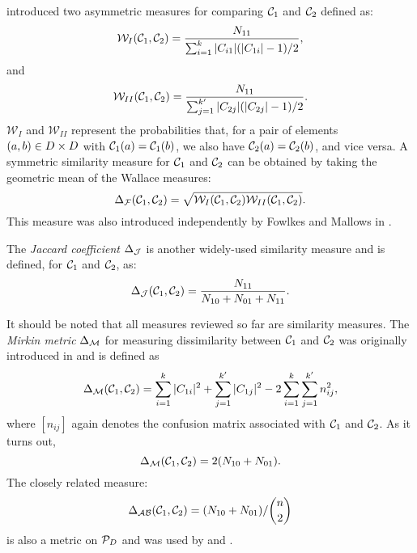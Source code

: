 \citet{wallace-1983} introduced two asymmetric measures for comparing
$\mathcal{C}_1$ and $\mathcal{C}_2$ defined as:
\begin{equation*}
  \mathcal{W}_{I}(\mathcal{C}_1,\mathcal{C}_2) =
  \frac{N_{11}}{\sum_{i=1}^{k} |C_{i1}|(|C_{1i}|-1)/2},
\end{equation*}
and
\begin{equation*}
  \mathcal{W}_{II}(\mathcal{C}_1,\mathcal{C}_2) =
  \frac{N_{11}}{\sum_{j=1}^{k'} |C_{2j}|(|C_{2j}|-1)/2}.
\end{equation*}
$\mathcal{W}_{I}$ and $\mathcal{W}_{II}$ represent the probabilities that, for
a pair of elements $(a,b) \in D \times D$ with
$\mathcal{C}_1(a)=\mathcal{C}_1(b)$, we also have $\mathcal{C}_2(a)=\mathcal{C}_2(b)$, and vice versa.
A symmetric similarity measure for $\mathcal{C}_1$ and $\mathcal{C}_2$ can be obtained by
taking the geometric mean of the Wallace measures:
\begin{equation*}
  \Delta_{\mathcal{F}}(\mathcal{C}_1,\mathcal{C}_2) = \sqrt{\mathcal{W}_{I}(\mathcal{C}_1,\mathcal{C}_2)
                          \mathcal{W}_{II}(\mathcal{C}_1,\mathcal{C}_2)}.
\end{equation*}
This measure was also introduced independently by Fowlkes and Mallows in
\citep{fowlkes-mallows-1983}.

The \textit{Jaccard coefficient} $\Delta_{\mathcal{J}}$ is another widely-used
similarity measure and is defined, for $\mathcal{C}_1$ and $\mathcal{C}_2$, as:
\begin{equation*}
  \Delta_{\mathcal{J}}(\mathcal{C}_1,\mathcal{C}_2) = \frac{N_{11}}{N_{10}+N_{01}+N_{11}}.
\end{equation*}

It should be noted that all measures reviewed so far are similarity measures.
The \textit{Mirkin metric} $\Delta_{\mathcal{M}}$ for measuring dissimilarity
between $\mathcal{C}_1$ and $\mathcal{C}_2$ was originally introduced in
\citep{mirkin1996mathematical} and is defined as
\begin{equation*}
  \Delta_{\mathcal{M}}(\mathcal{C}_1,\mathcal{C}_2) = \sum_{i=1}^{k} |C_{1i}|^2 +
                    \sum_{j=1}^{k'} |C_{1j}|^2 -
                    2\sum_{i=1}^{k}\sum_{j=1}^{k'} n_{ij}^2,
\end{equation*}
where $[n_{ij}]$ again denotes the confusion matrix associated with $\mathcal{C}_1$
and $\mathcal{C}_2$.  As it turns out, \[\Delta_{\mathcal{M}}(\mathcal{C}_1,\mathcal{C}_2)=2(N_{10}+N_{01}).\] The
closely related measure: \[\Delta_{\mathcal{AB}}(\mathcal{C}_1,\mathcal{C}_2)=(N_{10}+N_{01})/\binom{n}{2}\] is
also a metric on $\mathcal{P}_{D}$ and was used by
\citet{mirkin1970measurement} and \citet{arabie1973multidimensional}.

